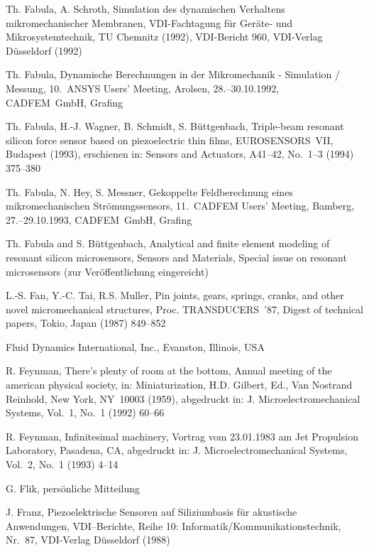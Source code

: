 \begin{thebibliography}{xxx}
 Th. Fabula, A. Schroth, Simulation des dynamischen Verhaltens
 mikromechanischer Membranen, VDI-Fachtagung für Geräte- und
 Mikrosystemtechnik, TU Chemnitz (1992), VDI-Bericht 960, VDI-Verlag
 Düsseldorf (1992)

 Th. Fabula, Dynamische Berechnungen in der Mikromechanik - Simulation /
 Messung, 10.~{\sf ANSYS} Users' Meeting, Arolsen, 28.--30.10.1992,
 CADFEM~GmbH, Grafing

 Th. Fabula, H.-J. Wagner, B. Schmidt, S. Büttgenbach, Triple-beam resonant
 silicon force sensor based on piezoelectric thin films, EUROSENSORS~VII,
 Budapest (1993), erschienen in: Sensors and Actuators, A41--42,
 No.~1--3 (1994) 375--380

 Th. Fabula, N. Hey, S. Messner, Gekoppelte Feldberechnung eines
 mikromechanischen Strömungssensors, 11.~CADFEM Users' Meeting, Bamberg,
 27.--29.10.1993, CADFEM~GmbH, Grafing

 Th. Fabula and S. Büttgenbach, Analytical and finite element modeling of
 resonant silicon microsensors, Sensors and Materials, Special issue on
 resonant microsensors (zur Veröffentlichung eingereicht)

 L.-S. Fan, Y.-C. Tai, R.S. Muller, Pin joints, gears, springs, cranks, and
 other novel micromechanical structures, Proc. TRANSDUCERS~'87, Digest of
 technical papers, Tokio, Japan (1987) 849--852

  Fluid Dynamics International, Inc., Evanston, Illinois, USA

 R. Feynman, There's plenty of room at the bottom, Annual meeting of the
 american physical society, in: Miniaturization, H.D. Gilbert, Ed.,
 Van Nostrand Reinhold, New York, NY~10003 (1959), abgedruckt in:
 J. Microelectromechanical Systems, Vol.~1, No.~1 (1992) 60--66

 R. Feynman, Infinitesimal machinery, Vortrag vom 23.01.1983 am
 Jet Propulsion Laboratory, Pasadena, CA, abgedruckt in:
 J. Microelectromechanical Systems, Vol.~2, No.~1 (1993) 4--14

 G. Flik, persönliche Mitteilung

 J. Franz, Piezoelektrische Sensoren auf Siliziumbasis für akustische
 Anwendungen, VDI--Berichte, Reihe 10: Informatik/Kommunikationstechnik,
 Nr.~87, VDI-Verlag Düsseldorf (1988)


\end{thebibliography}
